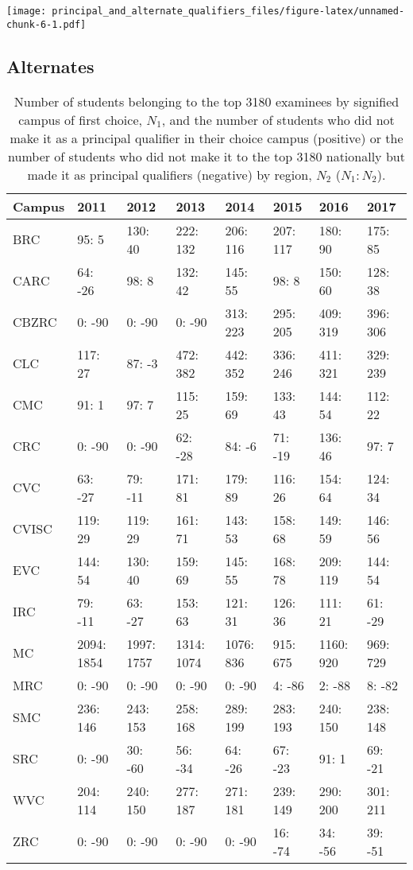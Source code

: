 \documentclass[]{article}
\begin{document}
\texttt{[image: principal\_and\_alternate\_qualifiers\_files/figure-latex/unnamed-chunk-6-1.pdf]}

\hypertarget{alternates}{%
\subsection{Alternates}\label{alternates}}

\begin{table}

\caption{\label{tab:unnamed-chunk-10}Number of students belonging to the top 3180 examinees by signified campus of first choice, $N_1$, and the number of students who did not make it as a principal qualifier in their choice campus (positive) or the number of students who did not make it to the top 3180 nationally but made it as principal qualifiers (negative) by region, $N_2$ ($N_1: N_2$).}
\centering
\begin{tabular}[t]{llllllll}
\toprule
Campus & 2011 & 2012 & 2013 & 2014 & 2015 & 2016 & 2017\\
\midrule
BRC & 95: 5 & 130: 40 & 222: 132 & 206: 116 & 207: 117 & 180: 90 & 175: 85\\
CARC & 64: -26 & 98: 8 & 132: 42 & 145: 55 & 98: 8 & 150: 60 & 128: 38\\
CBZRC & 0: -90 & 0: -90 & 0: -90 & 313: 223 & 295: 205 & 409: 319 & 396: 306\\
CLC & 117: 27 & 87: -3 & 472: 382 & 442: 352 & 336: 246 & 411: 321 & 329: 239\\
CMC & 91: 1 & 97: 7 & 115: 25 & 159: 69 & 133: 43 & 144: 54 & 112: 22\\
\addlinespace
CRC & 0: -90 & 0: -90 & 62: -28 & 84: -6 & 71: -19 & 136: 46 & 97: 7\\
CVC & 63: -27 & 79: -11 & 171: 81 & 179: 89 & 116: 26 & 154: 64 & 124: 34\\
CVISC & 119: 29 & 119: 29 & 161: 71 & 143: 53 & 158: 68 & 149: 59 & 146: 56\\
EVC & 144: 54 & 130: 40 & 159: 69 & 145: 55 & 168: 78 & 209: 119 & 144: 54\\
IRC & 79: -11 & 63: -27 & 153: 63 & 121: 31 & 126: 36 & 111: 21 & 61: -29\\
\addlinespace
MC & 2094: 1854 & 1997: 1757 & 1314: 1074 & 1076: 836 & 915: 675 & 1160: 920 & 969: 729\\
MRC & 0: -90 & 0: -90 & 0: -90 & 0: -90 & 4: -86 & 2: -88 & 8: -82\\
SMC & 236: 146 & 243: 153 & 258: 168 & 289: 199 & 283: 193 & 240: 150 & 238: 148\\
SRC & 0: -90 & 30: -60 & 56: -34 & 64: -26 & 67: -23 & 91: 1 & 69: -21\\
WVC & 204: 114 & 240: 150 & 277: 187 & 271: 181 & 239: 149 & 290: 200 & 301: 211\\
ZRC & 0: -90 & 0: -90 & 0: -90 & 0: -90 & 16: -74 & 34: -56 & 39: -51\\
\bottomrule
\end{tabular}
\end{table}
\end{document}
